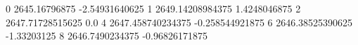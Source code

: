 0 2645.16796875 -2.54931640625
1 2649.14208984375 1.4248046875
2 2647.71728515625 0.0
4 2647.458740234375 -0.258544921875
6 2646.38525390625 -1.33203125
8 2646.7490234375 -0.96826171875
